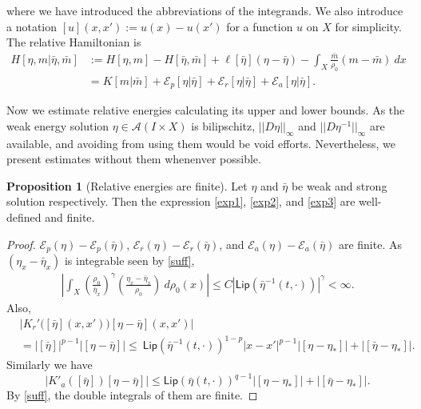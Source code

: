 \documentclass[10pt, letterpaper]{article}
\def\E{{\mathcal{E}}}
\def\Lip{{\textsf{Lip}}}
\def\dr{{d\rho_0(x)}}
\theoremstyle{definition}
\newtheorem{proposition}[subsubsection]{Proposition}
\theoremstyle{remark}
\begin{document}
where we have introduced the abbreviations of the integrands. We also introduce a notation $[u](x,x'):=u(x)-u(x')$ for a function $u$ on $X$ for simplicity. The relative Hamiltonian is
\begin{equation} \label{relHam}
    \begin{aligned}
    H[\eta, {m}| \bar\eta, \bar{m}]&:= H[\eta, {m}] - H[\bar{\eta}, \bar{m}] +\ell[\bar\eta](\eta-\bar\eta) - \int_X \frac{\bar{m}}{\rho_0}({m} - \bar{m}) \: dx\\
    &=K[{m} | \bar{m}] + \mathcal{E}_p[\eta | \bar{\eta}] + \mathcal{E}_r[\eta | \bar{\eta}] + \mathcal{E}_a[\eta | \bar{\eta}].
    \end{aligned}
\end{equation}

Now we estimate relative energies calculating its upper and lower bounds. As the weak energy solution $\eta \in \mathcal{A}(I\times X)$ is bilipschitz, $||D\eta||_\infty$ and $||D\eta^{-1}||_\infty$ are available, and avoiding from using them would be void efforts.  Nevertheless, we present estimates without them whenenver possible.
\begin{proposition}[Relative energies are finite] Let $\eta$ and $\bar\eta$ be weak and strong solution respectively. Then the expression \eqref{exp1}, \eqref{exp2}, and \eqref{exp3} are well-defined and finite.
\end{proposition} \label{ubnd}
\begin{proof}
$\E_p(\eta) - \E_p(\bar\eta)$, $\E_r(\eta) - \E_r(\bar\eta)$, and $\E_a(\eta)- \E_a(\bar\eta)$ are finite. As $(\eta_x - \bar\eta_x)$ is integrable seen by \eqref{suff},
\begin{align*}
 \left|\int_X \left(\frac{\rho_0}{\bar\eta_x}\right)^{\gamma} \left(\frac{\eta_x - \bar\eta_x}{\rho_0}\right)\:\dr \right| \le C|\Lip(\bar\eta^{-1}(t,\cdot))|^\gamma < \infty.
\end{align*}
Also,  
\begin{align*}
 &\left|K_r'\big([\bar\eta](x,x')\big)[\eta-\bar\eta](x,x')\right| \\
 &= \big|[\bar\eta]\big|^{p-1} \big|[\eta-\bar\eta]\big|
 \le ~ \Lip(\bar\eta^{-1}(t,\cdot))^{1-p} |x-x'|^{p-1}\big|[\eta-\eta_*]\big| + \big|[\bar\eta-\eta_*]\big|. 
 \end{align*}
Similarly we have
$$\left|K'_a([\bar\eta])[\eta-\bar\eta]\right| \le \Lip(\bar\eta(t,\cdot))^{q-1}\big|[\eta-\eta_*]\big| + \big|[\bar\eta-\eta_*]\big|.$$
By \eqref{suff}, the double integrals of them are finite. 
\end{proof}
\end{document}
